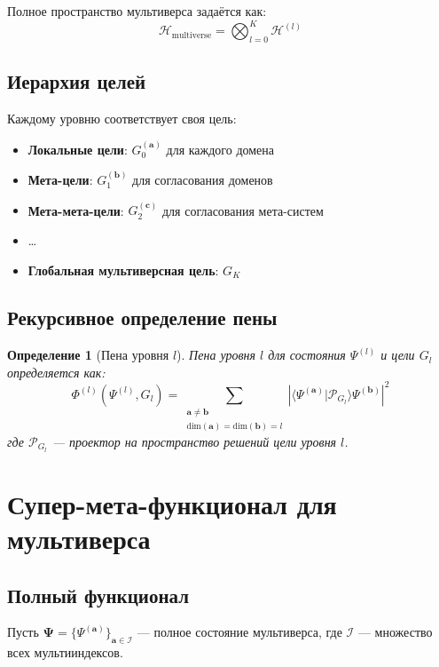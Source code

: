 \documentclass[12pt,a4paper]{article}
\newtheorem{definition}[theorem]{Определение}
\newcommand{\braket}[2]{\langle#1|#2\rangle}
\newcommand{\calH}{\mathcal{H}}
\newcommand{\calP}{\mathcal{P}}
\newcommand{\calI}{\mathcal{I}}
\newcommand{\bfPsi}{\mathbf{\Psi}}
\newcommand{\bfa}{\mathbf{a}}
\newcommand{\bfb}{\mathbf{b}}
\newcommand{\bfc}{\mathbf{c}}
\newcommand{\PhiFunc}{\Phi}
\begin{document}
Полное пространство мультиверса задаётся как:
\begin{equation}
\calH_{\text{multiverse}} = \bigotimes_{l=0}^K \calH^{(l)}
\end{equation}

\subsection{Иерархия целей}

Каждому уровню соответствует своя цель:
\begin{itemize}
    \item \textbf{Локальные цели}: $G_0^{(\bfa)}$ для каждого домена
    \item \textbf{Мета-цели}: $G_1^{(\bfb)}$ для согласования доменов
    \item \textbf{Мета-мета-цели}: $G_2^{(\bfc)}$ для согласования мета-систем
    \item \ldots
    \item \textbf{Глобальная мультиверсная цель}: $G_K$
\end{itemize}

\subsection{Рекурсивное определение пены}

\begin{definition}[Пена уровня $l$]
Пена уровня $l$ для состояния $\Psi^{(l)}$ и цели $G_l$ определяется как:
\begin{equation}
\PhiFunc^{(l)}(\Psi^{(l)}, G_l) = \sum_{\substack{\bfa \neq \bfb \\ \text{dim}(\bfa)=\text{dim}(\bfb)=l}} 
\left| \braket{\Psi^{(\bfa)}}{\calP_{G_l}}{\Psi^{(\bfb)}} \right|^2
\end{equation}
где $\calP_{G_l}$ --- проектор на пространство решений цели уровня $l$.
\end{definition}

\section{Супер-мета-функционал для мультиверса}

\subsection{Полный функционал}

Пусть $\bfPsi = \{\Psi^{(\bfa)}\}_{\bfa\in\calI}$ --- полное состояние мультиверса, где $\calI$ --- множество всех мультииндексов.
\end{document}
